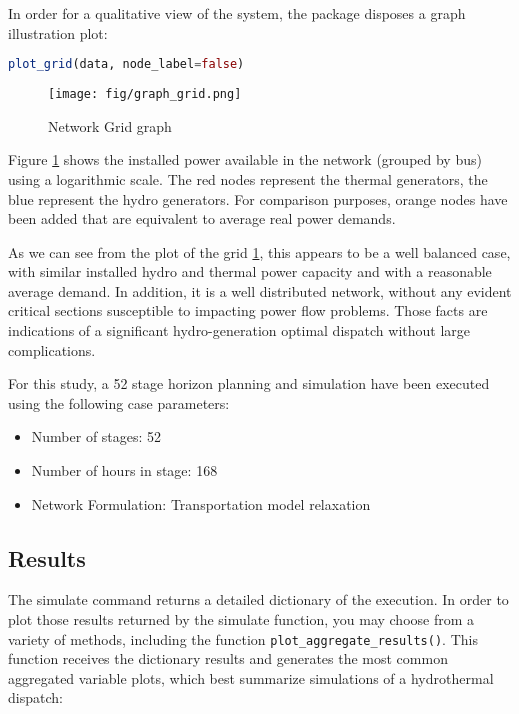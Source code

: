 \documentclass{juliacon}
\begin{document}
In order for a qualitative view of the system, the package disposes a graph illustration plot:

\begin{lstlisting}[language = Julia]
plot_grid(data, node_label=false)
\end{lstlisting}

\begin{figure}[htb]
\centerline{\texttt{[image: fig/graph\_grid.png]}}
\caption{Network Grid graph}
\label{fig:graph_grid}
\end{figure}

Figure \ref{fig:graph_grid} shows the installed power available in the network (grouped by bus) using a logarithmic scale. The red nodes represent the thermal generators, the blue represent the hydro generators. For comparison purposes, orange nodes have been added that are equivalent to average real power demands.

As we can see from the plot of the grid \ref{fig:graph_grid}, this appears to be a well balanced case, with similar installed hydro and thermal power capacity and with a reasonable average demand. In addition, it is a well distributed network, without any evident critical sections susceptible to impacting power flow problems. Those facts are indications of a significant hydro-generation optimal dispatch without large complications.

For this study, a 52 stage horizon planning and simulation have been executed using the following case parameters:

\begin{itemize}
    \item Number of stages: 52
    \item Number of hours in stage: 168 
    \item Network Formulation: Transportation model relaxation
\end{itemize}

\subsection{Results} %

The simulate command returns a detailed dictionary of the execution. In order to plot those results returned by the simulate function, you may choose from a variety of methods, including the function \texttt{plot\_aggregate\_results()}. This function receives the dictionary results and generates the most common aggregated variable plots, which best summarize simulations of a hydrothermal dispatch:
\end{document}
